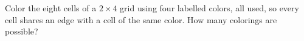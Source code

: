 Color the eight cells of a $2\times4$ grid using four labelled colors, all used, so every cell shares an edge with a cell of the same color. How many colorings are possible?
